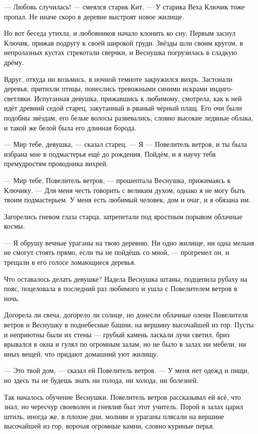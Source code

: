 --- Любовь случилась! --- смеялся старик Кит.
--- У старика Веха Ключик тоже пропал.
Не иначе скоро в деревне выстроят новое жилище.

Но вот беседа утихла, и любовников начало клонить ко сну.
Первым заснул Ключик, прижав подругу к своей широкой груди.
Звёзды шли своим кругом, в непролазных кустах стрекотали сверчки, и Веснушка погрузилась в сладкую дрёму.

Вдруг, откуда ни возьмись, в ночной темноте закружился вихрь.
Застонали деревья, притихли птицы, понеслись тревожными синими искрами индиго-светляки.
Испуганная девушка, прижавшись к любимому, смотрела, как к ней идёт древний седой старец, закутанный в рваный чёрный плащ.
Его очи были подобны звёздам, его белые волосы развевались, словно высокие ледяные облака, и такой же белой была его длинная борода.

--- Мир тебе, девушка, --- сказал старец.
--- Я --- Повелитель ветров, и ты была избрана мне в подмастерья ещё до рождения.
Пойдём, и я научу тебя премудростям проводника вихрей.

--- Мир тебе, Повелитель ветров, --- прошептала Веснушка, прижимаясь к Ключику.
--- Для меня честь говорить с великим духом, однако я не могу быть твоим подмастерьем.
У меня есть любимый человек, дом и очаг, и я обязана им.

Загорелись гневом глаза старца, затрепетали под яростным порывом облачные космы.

--- Я обрушу вечные ураганы на твою деревню.
Ни одно жилище, ни одна мельня не смогут стоять прямо, если ты не пойдёшь со мной, --- прогремел он, и трещали в его голосе ломающиеся деревья.

Что оставалось делать девушке?
Надела Веснушка штаны, подцепила рубаху на пояс, поцеловала в последний раз любимого и ушла с Повелителем ветров в ночь.

Догорела ли свеча, догорело ли солнце, но донесли облачные олени Повелителя ветров и Веснушку в поднебесные башни, на вершину высочайшей из гор.
Пусты и неприютны были их стены --- грубый камень ласкали лучи светил, бриз врывался в окна и гулял по огромным залам, но не было в залах ни мебели, ни иных вещей, что придают домашний уют жилищу.

--- Это твой дом, --- сказал ей Повелитель ветров.
--- У меня нет одежд и пищи, но здесь ты не будешь знать ни голода, ни холода, ни болезней.

Так началось обучение Веснушки.
Повелитель ветров рассказывал ей всё, что знал, но чересчур своеволен и гневлив был этот учитель.
Порой в залах царил штиль, иногда же, в плохие дни, молнии и ураганы плясали на вершине высочайшей из гор, ворочая огромные камни, словно куриные перья.

